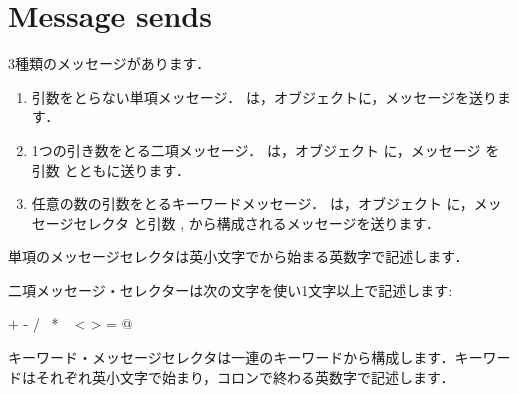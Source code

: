 \documentclass[a4paper,10pt,twoside]{book}
\begin{document}
\section{Message sends}

3種類のメッセージがあります．

\begin{enumerate}
	\item 引数をとらない単項メッセージ．
	は，オブジェクトに，メッセージを送ります．
	\item 1つの引き数をとる二項メッセージ．
	は，オブジェクト  に，メッセージ \ct{+} を引数  とともに送ります．
	\item 任意の数の引数をとるキーワードメッセージ．
	 は，オブジェクト  に，メッセージセレクタ  と引数 ,  から構成されるメッセージを送ります．
\end{enumerate}

単項のメッセージセレクタは英小文字でから始まる英数字で記述します．

二項メッセージ・セレクターは次の文字を使い1文字以上で記述します:
\begin{code}{}
+ - / \ * ~ < > = @ %
\end{code}
\noindent
キーワード・メッセージセレクタは一連のキーワードから構成します．キーワードはそれぞれ英小文字で始まり，コロンで終わる英数字で記述します．
\end{document}
